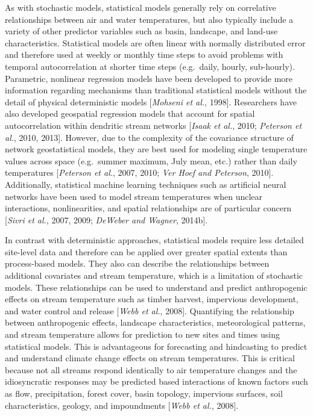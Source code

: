 As with stochastic models, statistical models generally rely on
correlative relationships between air and water temperatures, but also
typically include a variety of other predictor variables such as basin,
landscape, and land-use characteristics. Statistical models are often
linear with normally distributed error and therefore used at weekly or
monthly time steps to avoid problems with temporal autocorrelation at
shorter time steps (e.g.~daily, hourly, sub-hourly). Parametric,
nonlinear regression models have been developed to provide more
information regarding mechanisms than traditional statistical models
without the detail of physical deterministic models {[}\emph{Mohseni et
al.}, 1998{]}. Researchers have also developed geospatial regression
models that account for spatial autocorrelation within dendritic stream
networks {[}\emph{Isaak et al.}, 2010; \emph{Peterson et al.}, 2010,
2013{]}. However, due to the complexity of the covariance structure of
network geostatistical models, they are best used for modeling single
temperature values across space (e.g.~summer maximum, July mean, etc.)
rather than daily temperatures {[}\emph{Peterson et al.}, 2007, 2010;
\emph{{Ver Hoef} and Peterson}, 2010{]}. Additionally, statistical
machine learning techniques such as artificial neural networks have been
used to model stream temperatures when unclear interactions,
nonlinearities, and spatial relationships are of particular concern
{[}\emph{Sivri et al.}, 2007, 2009; \emph{DeWeber and Wagner}, 2014b{]}.

In contrast with deterministic approaches, statistical models require
less detailed site-level data and therefore can be applied over greater
spatial extents than process-based models. They also can describe the
relationships between additional covariates and stream temperature,
which is a limitation of stochastic models. These relationships can be
used to understand and predict anthropogenic effects on stream
temperature such as timber harvest, impervious development, and water
control and release {[}\emph{Webb et al.}, 2008{]}. Quantifying the
relationship between anthropogenic effects, landscape characteristics,
meteorological patterns, and stream temperature allows for prediction to
new sites and times using statistical models. This is advantageous for
forecasting and hindcasting to predict and understand climate change
effects on stream temperatures. This is critical because not all streams
respond identically to air temperature changes and the idiosyncratic
responses may be predicted based interactions of known factors such as
flow, precipitation, forest cover, basin topology, impervious surfaces,
soil characteristics, geology, and impoundments {[}\emph{Webb et al.},
2008{]}.

